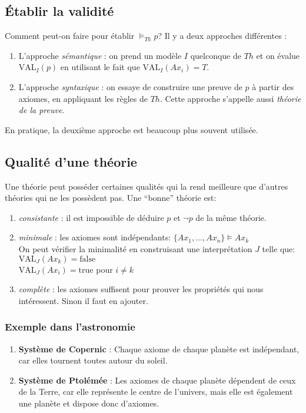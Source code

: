 {\subsection{Établir la validité}

Comment peut-on faire pour établir $\models_{Th} p$? Il y a deux approches différentes :
\begin{enumerate}
\item L'approche {\em sémantique} : on prend un modèle $I$ quelconque de $Th$ et on évalue $\textrm{VAL}_I (p)$
en utilisant le fait que $\text{VAL}_I (Ax_i)=T$.
\item L'approche {\em syntaxique} : on essaye de construire une preuve de $p$ à partir des axiomes, en appliquant les règles de $Th$.
Cette approche s'appelle aussi {\em théorie de la preuve}.\\
\end{enumerate}
En pratique, la deuxième approche est beaucoup plus souvent utilisée.\\

\subsection{Qualité d'une théorie}

Une théorie peut posséder certaines qualités qui la rend
meilleure que d'autres théories qui ne les possèdent pas.
Une ``bonne'' théorie est:
\begin {enumerate}
\item {\em consistante} : il est impossible de déduire \(p\) et \(\neg p\)  de la même théorie.
\item {\em minimale} : les axiomes sont indépendants: $\{Ax_1, \hdots, Ax_n\} \models Ax_k $\\
On peut vérifier la minimalité en construisant une interprétation $J$ telle que:\\
$\text{VAL}_J (Ax_k)= \mathrm{false}$\\
$\text{VAL}_J (Ax_i)= \mathrm{true}$ pour $i \neq k$
\item {\em complète} : les axiomes suffisent pour prouver les propriétés qui nous intéressent. Sinon il faut en ajouter.
\end {enumerate}

\subsubsection{Exemple dans l'astronomie}
\begin {enumerate}
\item {\textbf{Système de Copernic}} : Chaque axiome de chaque planète est indépendant, car elles tournent toutes autour du soleil.
\item{\textbf{Système de Ptolémée}} : Les axiomes de chaque planète dépendent de ceux de la Terre, car elle représente le centre de l'univers, mais elle est également une planète et dispose donc d'axiomes.
\end {enumerate}

}
